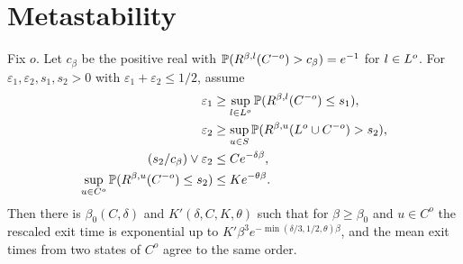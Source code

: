 \section{Metastability}

\begin{proposition}
  \label{prop12}
  \leanok
  Fix $o$.  Let $c_\beta$ be the positive real with
  $\mathbb{P}(R^{\beta,l}(C^{-o}) > c_\beta) = e^{-1}$ for $l \in L^o$.  For
  $\varepsilon_1, \varepsilon_2, s_1, s_2 > 0$ with
  $\varepsilon_1 + \varepsilon_2 \le 1/2$, assume
  \begin{align}
    \varepsilon_1 &\ge \sup_{l \in L^o} \mathbb{P}(R^{\beta,l}(C^{-o}) \le s_1),
      \label{eq:h15} \\
    \varepsilon_2 &\ge \sup_{u \in S} \mathbb{P}(R^{\beta,u}(L^o \cup C^{-o}) > s_2),
      \label{eq:h16} \\
    (s_2/c_\beta) \vee \varepsilon_2 &\le C e^{-\delta\beta}, \label{eq:h17} \\
    \sup_{u \in C^o} \mathbb{P}(R^{\beta,u}(C^{-o}) \le s_2) &\le K e^{-\theta\beta}.
      \label{eq:h18}
  \end{align}
  Then there is $\beta_0(C,\delta)$ and $K'(\delta,C,K,\theta)$ such that for
  $\beta \ge \beta_0$ and $u \in C^o$ the rescaled exit time is exponential up
  to $K' \beta^3 e^{-\min(\delta/3, 1/2, \theta)\beta}$, and the mean exit times
  from two states of $C^o$ agree to the same order.
\end{proposition}
